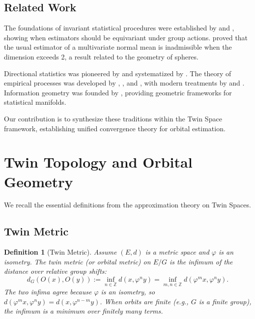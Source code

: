 \documentclass[11pt]{article}
\newtheorem{definition}[theorem]{Definition}
\newcommand{\Z}{\mathbb{Z}}
\begin{document}
\subsection{Related Work}

The foundations of invariant statistical procedures were established by \citet{Hunt1966} and \citet{Lehmann1998}, showing when estimators should be equivariant under group actions. \citet{Stein1956} proved that the usual estimator of a multivariate normal mean is inadmissible when the dimension exceeds 2, a result related to the geometry of spheres.

Directional statistics was pioneered by \citet{Fisher1953} and systematized by \citet{Mardia2000}. The theory of empirical processes was developed by \citet{Glivenko1933}, \citet{Cantelli1933}, and \citet{Donsker1952}, with modern treatments by \citet{Dudley1999} and \citet{vanderVaartWellner1996}. Information geometry was founded by \citet{Amari2016}, providing geometric frameworks for statistical manifolds.

Our contribution is to synthesize these traditions within the Twin Space framework, establishing unified convergence theory for orbital estimation.

\section{Twin Topology and Orbital Geometry}
\label{sec:topology}

We recall the essential definitions from the approximation theory on Twin Spaces.

\subsection{Twin Metric}

\begin{definition}[Twin Metric]\label{def:twin_metric}
Assume $(E, d)$ is a metric space and $\varphi$ is an isometry. The twin metric (or orbital metric) on $E/G$ is the infimum of the distance over relative group shifts:
\begin{equation}\label{eq:twin_metric}
d_G(O(x), O(y)) := \inf_{n \in \Z} d(x, \varphi^n y)
= \inf_{m,n \in \Z} d(\varphi^m x, \varphi^n y).
\end{equation}
The two infima agree because $\varphi$ is an isometry, so $d(\varphi^m x,\varphi^n y)=d(x,\varphi^{n-m}y)$. When orbits are finite (e.g., $G$ is a finite group), the infimum is a minimum over finitely many terms.
\end{definition}
\end{document}
